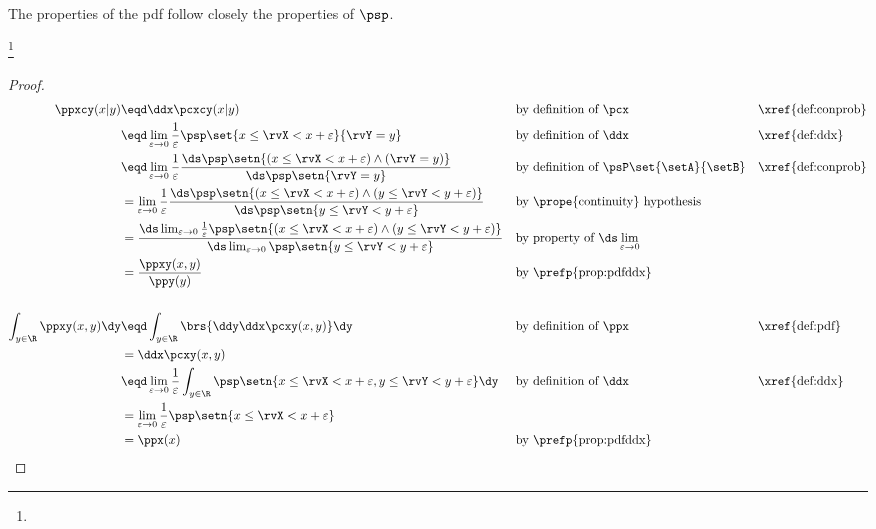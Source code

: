 The properties of the pdf follow closely the properties of  $\psp$.
\begin{theorem}
\footnote{
  }
\end{theorem}
\begin{proof}
\begin{align*}
  \ppxcy(x|y)
    &\eqd \ddx\pcxcy(x|y)
    && \text{by definition of $\pcx$}
    && \text{\xref{def:conprob}}
  \\&\eqd \lim_{\varepsilon\to0} \frac{1}{\varepsilon} \psp\set{x\le\rvX < x+\varepsilon}{\rvY=y}
    && \text{by definition of $\ddx$}
    && \text{\xref{def:ddx}}
  \\&\eqd \lim_{\varepsilon\to0}
          \frac{1}{\varepsilon}
          \frac{\ds\psp\setn{(x\le\rvX < x+\varepsilon) \land (\rvY=y)}}
               {\ds\psp\setn{\rvY=y}}
    && \text{by definition of $\psP\set{\setA}{\setB}$}
    && \text{\xref{def:conprob}}
  \\&= \lim_{\varepsilon\to0}
       \frac{1}{\varepsilon}
       \frac{\ds\psp\setn{(x\le\rvX < x+\varepsilon) \land (y\le\rvY<y+\varepsilon)}}
            {\ds\psp\setn{y\le\rvY<y+\varepsilon}}
    && \text{by \prope{continuity} hypothesis}
  \\&=  \frac{\ds\lim_{\varepsilon\to0} \frac{1}{\varepsilon}\psp\setn{(x\le\rvX < x+\varepsilon) \land (y\le\rvY<y+\varepsilon)}}
             {\ds\lim_{\varepsilon\to0}                      \psp\setn{y\le\rvY<y+\varepsilon}}
    && \text{by property of $\ds\lim_{\varepsilon\to0}$}
  \\&=    \frac{\ppxy(x,y)}{\ppy(y)}
    && \text{by \prefp{prop:pdfddx}}
\\
\\
  \int_{y\in\R}\ppxy(x,y)\dy
    &\eqd \int_{y\in\R} \brs{ \ddy\ddx\pcxy(x,y) } \dy
    && \text{by definition of $\ppx$}
    && \text{\xref{def:pdf}}
  \\&= \ddx\pcxy(x,y)
  \\&\eqd \lim_{\varepsilon\to0} \frac{1}{\varepsilon}
          \int_{y\in\R} \psp\setn{x\le\rvX<x+\varepsilon, y\le\rvY<y+\varepsilon} \dy
    && \text{by definition of $\ddx$}
    && \text{\xref{def:ddx}}
  \\&=    \lim_{\varepsilon\to0} \frac{1}{\varepsilon} \psp\setn{x\le\rvX<x+\varepsilon}
  \\&= \ppx(x)
    && \text{by \prefp{prop:pdfddx}}
\end{align*}
\end{proof}

